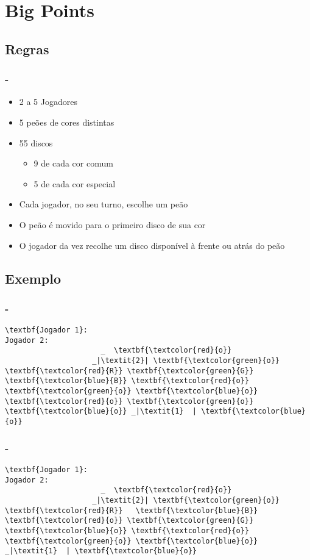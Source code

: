 \section{Big Points}
\subsection{Regras}
\begin{frame}
\frametitle{\secname - \subsecname}
\begin{itemize}
 \item 2 a 5 Jogadores
 \pause
 \item 5 peões de cores distintas
 \pause
 \item 55 discos
 \begin{itemize}
	 \pause
	 \item 9 de cada cor comum
	 \pause
	 \item 5 de cada cor especial
 \end{itemize}
 \pause
 \item Cada jogador, no seu turno, escolhe um peão
 \pause
 \item O peão é movido para o primeiro disco de sua cor
 \pause
 \item O jogador da vez recolhe um disco disponível à frente ou atrás do peão
\end{itemize}
\end{frame}


\subsection{Exemplo}
\begin{frame}[fragile]
\frametitle{\secname - \subsecname}
\begin{Verbatim}[commandchars=\\\{\}]
\textbf{Jogador 1}:
Jogador 2:
                      _  \textbf{\textcolor{red}{o}}
                    _|\textit{2}| \textbf{\textcolor{green}{o}}
\textbf{\textcolor{red}{R}} \textbf{\textcolor{green}{G}} \textbf{\textcolor{blue}{B}} \textbf{\textcolor{red}{o}} \textbf{\textcolor{green}{o}} \textbf{\textcolor{blue}{o}} \textbf{\textcolor{red}{o}} \textbf{\textcolor{green}{o}} \textbf{\textcolor{blue}{o}} _|\textit{1}  | \textbf{\textcolor{blue}{o}}
\end{Verbatim}
\end{frame}

\begin{frame}[fragile]
\frametitle{\secname - \subsecname}
\begin{Verbatim}[commandchars=\\\{\}]
\textbf{Jogador 1}:
Jogador 2:
                      _  \textbf{\textcolor{red}{o}}
                    _|\textit{2}| \textbf{\textcolor{green}{o}}
\textbf{\textcolor{red}{R}}   \textbf{\textcolor{blue}{B}} \textbf{\textcolor{red}{o}} \textbf{\textcolor{green}{G}} \textbf{\textcolor{blue}{o}} \textbf{\textcolor{red}{o}} \textbf{\textcolor{green}{o}} \textbf{\textcolor{blue}{o}} _|\textit{1}  | \textbf{\textcolor{blue}{o}}
\end{Verbatim}
\end{frame}

